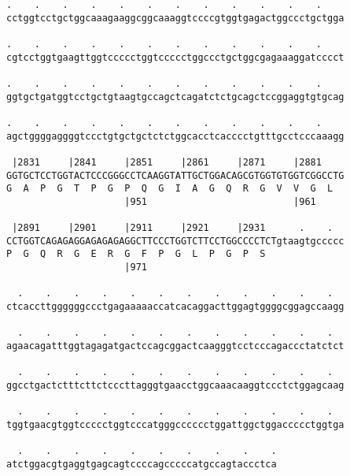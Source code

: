 \documentclass{article}
\begin{document}
\begin{Verbatim}
.    .    .    .    .    .    .    .    .    .    .    .    
cctggtcctgctggcaaagaaggcggcaaaggtccccgtggtgagactggccctgctgga
                                                            
.    .    .    .    .    .    .    .    .    .    .    .    
cgtcctggtgaagttggtccccctggtccccctggccctgctggcgagaaaggatcccct
                                                            
.    .    .    .    .    .    .    .    .    .    .    .    
ggtgctgatggtcctgctgtaagtgccagctcagatctctgcagctccggaggtgtgcag
                                                            
.    .    .    .    .    .    .    .    .    .    .    .    
agctggggaggggtccctgtgctgctctctggcacctcacccctgtttgcctcccaaagg
                                                            
 |2831     |2841     |2851     |2861     |2871     |2881    
GGTGCTCCTGGTACTCCCGGGCCTCAAGGTATTGCTGGACAGCGTGGTGTGGTCGGCCTG
G  A  P  G  T  P  G  P  Q  G  I  A  G  Q  R  G  V  V  G  L  
                     |951                          |961     
  
 |2891     |2901     |2911     |2921     |2931      .    .  
CCTGGTCAGAGAGGAGAGAGAGGCTTCCCTGGTCTTCCTGGCCCCTCTgtaagtgccccc
P  G  Q  R  G  E  R  G  F  P  G  L  P  G  P  S              
                     |971                                   
  
  .    .    .    .    .    .    .    .    .    .    .    .  
ctcaccttggggggccctgagaaaaaccatcacaggacttggagtggggcggagccaagg
                                                            
  .    .    .    .    .    .    .    .    .    .    .    .  
agaacagatttggtagagatgactccagcggactcaagggtcctcccagaccctatctct
                                                            
  .    .    .    .    .    .    .    .    .    .    .    .  
ggcctgactctttcttctcccttagggtgaacctggcaaacaaggtccctctggagcaag
                                                            
  .    .    .    .    .    .    .    .    .    .    .    .  
tggtgaacgtggtccccctggtcccatgggcccccctggattggctggaccccctggtga
                                                            
  .    .    .    .    .    .    .    .    .    .
atctggacgtgaggtgagcagtccccagcccccatgccagtaccctca
                                                
                                                
 

\end{Verbatim}
\end{document}
